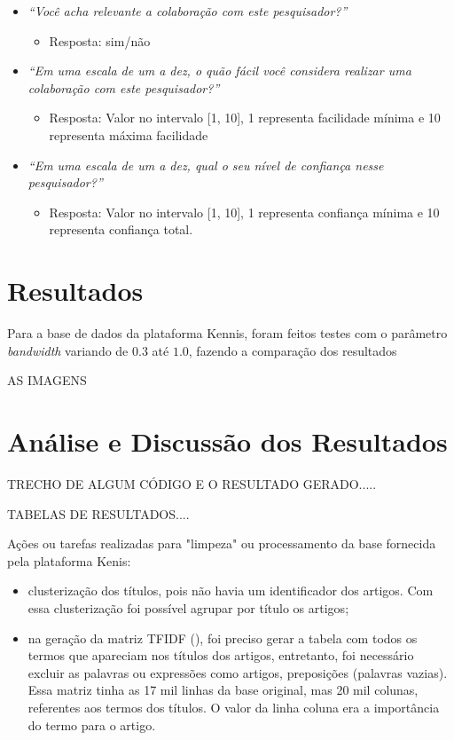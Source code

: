 \documentclass[12pt]{article}
\begin{document}
\begin{itemize}
  \item \textit{“Você acha relevante a colaboração com este pesquisador?”}
  \begin{itemize}
    \item Resposta: sim/não
  \end{itemize}
  \item \textit{“Em uma escala de um a dez, o quão fácil você considera realizar uma colaboração com este pesquisador?”}
  \begin{itemize}
    \item Resposta: Valor no intervalo [1, 10], 1 representa facilidade mínima e 10 representa máxima facilidade
  \end{itemize}
  \item \textit{“Em uma escala de um a dez, qual o seu nível de confiança nesse pesquisador?”}
  \begin{itemize}
    \item Resposta: Valor no intervalo [1, 10], 1 representa confiança mínima e 10 representa confiança total.  
  \end{itemize}
\end{itemize}

\section{Resultados}

Para a base de dados da plataforma Kennis, foram feitos testes com o parâmetro \textit{bandwidth} variando de $0.3$ até $1.0$, fazendo a comparação dos resultados

AS IMAGENS

\section{Análise e Discussão dos Resultados}

TRECHO DE ALGUM CÓDIGO E O RESULTADO GERADO.....

TABELAS DE RESULTADOS....
 
Ações ou tarefas realizadas para "limpeza" ou processamento da base fornecida pela plataforma Kenis:
\begin{itemize}
    \item clusterização dos títulos, pois não havia um identificador dos artigos. Com essa clusterização foi possível agrupar por título os artigos;
    \item na geração da matriz TFIDF (), foi preciso gerar a tabela com todos os termos que apareciam nos títulos dos artigos, entretanto, foi necessário excluir as palavras ou expressões como artigos, preposições (palavras vazias). Essa matriz tinha as 17 mil linhas da base original, mas 20 mil colunas, referentes aos termos dos títulos. O valor da linha coluna era a importância do termo para o artigo.
\end{itemize}{}
\end{document}
